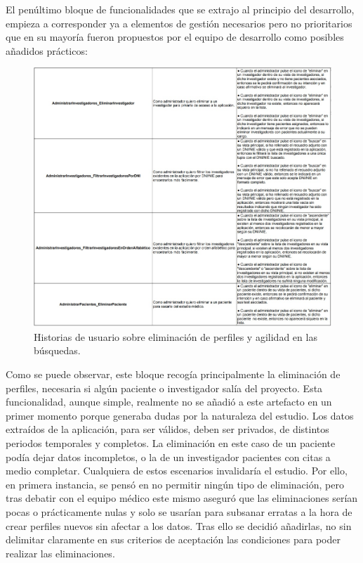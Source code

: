 El penúltimo bloque de funcionalidades que se extrajo al principio del desarrollo, empieza a corresponder ya a elementos de gestión necesarios pero no prioritarios que en su mayoría fueron propuestos por el equipo de desarrollo como posibles añadidos prácticos:
\newline

 \begin{figure}[h]
    \centering
     \includegraphics[width=1\textwidth]{images/historiasUsuario-4.jpg}
    \caption{Historias de usuario sobre eliminación de perfiles y agilidad en las búsquedas.}
\end{figure}

Como se puede observar, este bloque recogía principalmente la eliminación de perfiles, necesaria si algún paciente o investigador salía del proyecto. Esta funcionalidad, aunque simple, realmente no se añadió a este artefacto en un primer momento porque generaba dudas por la naturaleza del estudio. Los datos extraídos de la aplicación, para ser válidos, deben ser privados, de distintos periodos temporales y completos. La eliminación en este caso de un paciente podía dejar datos incompletos, o la de un investigador pacientes con citas a medio completar. Cualquiera de estos escenarios invalidaría el estudio. Por ello, en primera instancia, se pensó en no permitir ningún tipo de eliminación, pero tras debatir con el equipo médico este mismo aseguró que las eliminaciones serían pocas o prácticamente nulas y solo se usarían para subsanar erratas a la hora de crear perfiles nuevos sin afectar a los datos. Tras ello se decidió añadirlas, no sin delimitar claramente en sus criterios de aceptación las condiciones para poder realizar las eliminaciones.
\newline

